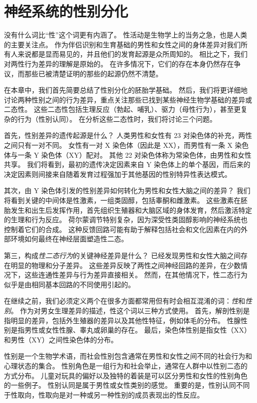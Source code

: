 \chapter{神经系统的性别分化} \label{chap:chap51}

没有什么词比“性”这个词更有内涵了。
性活动是生物学上的当务之急，也是人类的主要关注点。
作为伴侣识别和生育基础的男性和女性之间的身体差异对我们所有人来说都是显而易见的，并且他们的发育起源是众所周知的。
相比之下，我们对两性行为差异的理解是原始的。
在许多情况下，它们的存在本身仍然存在争议，而那些已被清楚证明的那些的起源仍然不清楚。


在本章中，我们首先简要总结了性别分化的胚胎学基础。
然后，我们将更详细地讨论两种性别之间的行为差异，重点关注那些已找到某些神经生物学基础的差异或二态性。
这些二态性包括生理反应（勃起、哺乳）、驱力（母性行为），甚至更复杂的行为（性别认同）。
在分析这些二态性时，我们将讨论三个问题。


首先，性别差异的遗传起源是什么？
人类男性和女性有 23 对染色体的补充，两性之间只有一对不同。
女性有一对 X 染色体（因此是 XX），而男性有一条 X 染色体与一条 Y 染色体（XY）配对。
其他 22 对染色体称为常染色体，由男性和女性共享。
我们将看到，最初的遗传决定因素来自 Y 染色体上的单个基因，而后来的决定因素则间接来自随着发育过程强加于其他基因的性别特异性表达模式。


其次，由 Y 染色体引发的性别差异如何转化为男性和女性大脑之间的差异？
我们将看到关键的中间体是性激素，一组类固醇，包括睾酮和雌激素。
这些激素在胚胎发生和出生后发挥作用，首先组织生殖器和大脑区域的身体发育，然后激活特定的生理和行为反应。
荷尔蒙调节特别复杂，因为深受性类固醇影响的神经系统也控制着它们的合成。
这种反馈回路可能有助于解释包括社会和文化因素在内的外部环境如何最终在神经层面塑造性二态。


第三，构成\textit{性二态行为}的关键神经差异是什么？
已经发现男性和女性大脑之间存在明显的物理和分子差异。
这些差异反映了两性之间神经回路的差异，在少数情况下，这些连通性差异与行为差异直接相关。
然而，在其他情况下，性二态行为似乎是由相同基本回路的不同使用引起的。


在继续之前，我们必须定义两个在很多方面都常用但有时会相互混淆的词：\textit{性}和\textit{性别}。
作为对男女生理差异的描述，性这个词以三种方式使用。
首先，解剖性别是指明显的差异，包括外生殖器的差异以及其他性特征，例如体毛的分布。
性腺性别是指男性或女性性腺、睾丸或卵巢的存在。
最后，染色体性别是指女性（XX）和男性（XY）之间性染色体的分布。


性别是一个生物学术语，而社会性别包含通常在男性和女性之间不同的社会行为和心理状态的集合。
性别角色是一组行为和社会举止，通常在人群中以性别二态的方式分布。
儿童对玩具的偏好以及独特的着装是可以区分男性和女性的性别角色的一些例子。
性别认同是属于男性或女性类别的感觉。
重要的是，性别认同不同于性取向，性取向是对一种或另一种性别的成员表现出的性反应。


